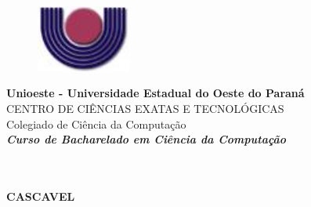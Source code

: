 \begin{figure}
	\centering
	\includegraphics[width = 3.13cm, height = 2.19cm]{Figuras/Simbolo.jpg}
\end{figure}
\fontsize{13}{13}
\noindent
\textbf{Unioeste - Universidade Estadual do Oeste do Paran\'{a}}\\
\fontsize{11}{11}
CENTRO DE CI\^{E}NCIAS EXATAS E TECNOL\'{O}GICAS\\
Colegiado de Ci\^{e}ncia da Computa\c{c}\~{a}o\\
\textbf{\textit{Curso de Bacharelado em Ci\^{e}ncia da Computa\c{c}\~{a}o}}
\vspace{9cm}
\begin{center}
\fontsize{13}{13}
\textbf{\titulo}\\
\vspace{0.3cm}
\textit{\autor}\\
\vspace{9cm}
\textbf{CASCAVEL}\\
\textbf{\ano}
\end{center}
